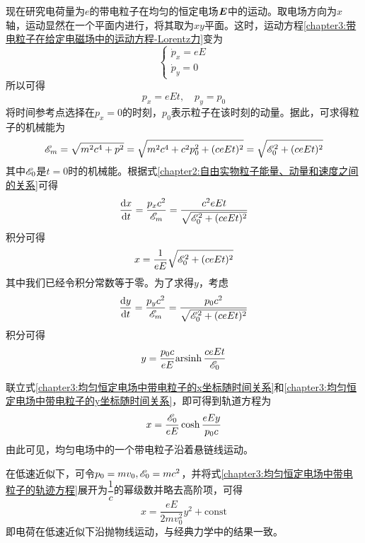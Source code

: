 现在研究电荷量为$e$的带电粒子在均匀的恒定电场$\boldsymbol{E}$中的运动。取电场方向为$x$轴，运动显然在一个平面内进行，将其取为$xy$平面。这时，运动方程\eqref{chapter3:带电粒子在给定电磁场中的运动方程-Lorentz力}变为
\begin{equation*}
\begin{cases}
	\dot{p}_x = eE \\
	\dot{p}_y = 0
\end{cases}
\end{equation*}
所以可得
\begin{equation}
	p_x = eEt,\quad p_y = p_0
	\label{chapter3:恒定电场中带电粒子的动量}
\end{equation}
将时间参考点选择在$p_x=0$的时刻，$p_0$表示粒子在该时刻的动量。据此，可求得粒子的机械能为
\begin{equation}
	\mathscr{E}_m = \sqrt{m^2c^4+p^2} = \sqrt{m^2c^4+c^2p_0^2+(ceEt)^2} = \sqrt{\mathscr{E}_0^2+(ceEt)^2}
	\label{chapter3:恒定电场中带电粒子的机械能}
\end{equation}
其中$\mathscr{E}_0$是$t=0$时的机械能。根据式\eqref{chapter2:自由实物粒子能量、动量和速度之间的关系}可得
\begin{equation*}
	\frac{\mathrm{d} x}{\mathrm{d} t} = \frac{p_xc^2}{\mathscr{E}_m} = \frac{c^2eEt}{\sqrt{\mathscr{E}_0^2+(ceEt)^2}}
\end{equation*}
积分可得
\begin{equation}
	x = \frac{1}{eE}\sqrt{\mathscr{E}_0^2+(ceEt)^2}
	\label{chapter3:均匀恒定电场中带电粒子的x坐标随时间关系}
\end{equation}
其中我们已经令积分常数等于零。为了求得$y$，考虑
\begin{equation*}
	\frac{\mathrm{d} y}{\mathrm{d} t} = \frac{p_yc^2}{\mathscr{E}_m} = \frac{p_0c^2}{\sqrt{\mathscr{E}_0^2+(ceEt)^2}}
\end{equation*}
积分可得
\begin{equation}
	y = \frac{p_0c}{eE}\mathrm{arsinh}\, \frac{ceEt}{\mathscr{E}_0}
	\label{chapter3:均匀恒定电场中带电粒子的y坐标随时间关系}
\end{equation}

联立式\eqref{chapter3:均匀恒定电场中带电粒子的x坐标随时间关系}和\eqref{chapter3:均匀恒定电场中带电粒子的y坐标随时间关系}，即可得到轨道方程为
\begin{equation}
	x = \frac{\mathscr{E}_0}{eE}\cosh \frac{eEy}{p_0c}
	\label{chapter3:均匀恒定电场中带电粒子的轨迹方程}
\end{equation}
由此可见，均匀电场中的一个带电粒子沿着悬链线运动。

在低速近似下，可令$p_0=mv_0, \mathscr{E}_0 = mc^2$，并将式\eqref{chapter3:均匀恒定电场中带电粒子的轨迹方程}展开为$\dfrac1c$的幂级数并略去高阶项，可得
\begin{equation*}
	x = \frac{eE}{2mv_0^2}y^2+\text{const}
\end{equation*}
即电荷在低速近似下沿抛物线运动，与经典力学中的结果一致。

